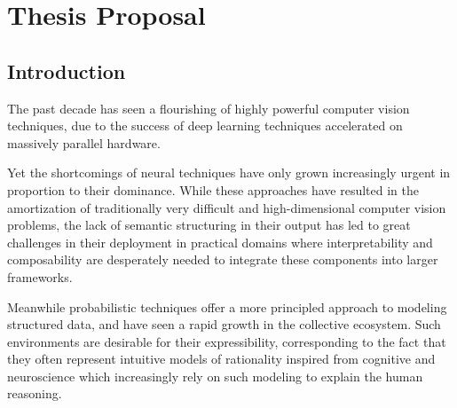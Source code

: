 
\chapter{Thesis Proposal}

\section{Introduction}

  The past decade has seen a flourishing of highly powerful computer vision
  techniques, due to the success of deep learning techniques accelerated on
  massively parallel hardware.

  Yet the shortcomings of neural techniques have only grown increasingly urgent
  in proportion to their dominance. While these approaches have resulted in the
  amortization of traditionally very difficult and high-dimensional computer
  vision problems, the lack of semantic structuring in their output has led to
  great challenges in their deployment in practical domains where
  interpretability and composability are desperately needed to integrate these
  components into larger frameworks.

  Meanwhile probabilistic techniques offer a more principled approach to modeling
  structured data, and have seen a rapid growth in the collective ecosystem. Such
  environments are desirable for their expressibility, corresponding to the fact
  that they often represent intuitive models of rationality inspired from
  cognitive and neuroscience which increasingly rely on such modeling to explain
  the human reasoning.


